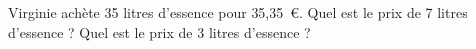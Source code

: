 Virginie achète 35 litres d'essence pour 35,35~\textgreek{\euro}. Quel est le prix de 7 litres d'essence ? Quel est le prix de 3 litres d'essence ?